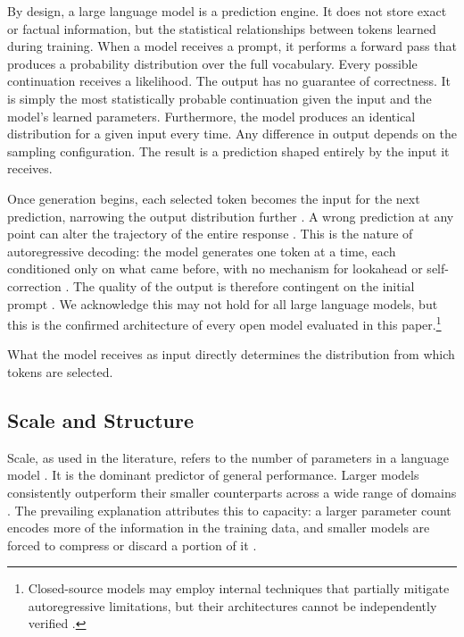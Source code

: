 \documentclass{article}
\begin{document}
By design, a large language model is a prediction engine. It does not store exact or factual information, but the statistical relationships between tokens learned during training. When a model receives a prompt, it performs a forward pass that produces a probability distribution over the full vocabulary. Every possible continuation receives a likelihood. The output has no guarantee of correctness. It is simply the most statistically probable continuation given the input and the model's learned parameters. Furthermore, the model produces an identical distribution for a given input every time. Any difference in output depends on the sampling configuration. The result is a prediction shaped entirely by the input it receives.

Once generation begins, each selected token becomes the input for the next prediction, narrowing the output distribution further \cite{brown2020gpt3}. A wrong prediction at any point can alter the trajectory of the entire response \cite{exposure_bias_ilp2022, lpsr2026}. This is the nature of autoregressive decoding: the model generates one token at a time, each conditioned only on what came before, with no mechanism for lookahead or self-correction \cite{brown2020gpt3, exposure_bias_ilp2022}. The quality of the output is therefore contingent on the initial prompt \cite{prompt_control_theory2023}. We acknowledge this may not hold for all large language models, but this is the confirmed architecture of every open model evaluated in this paper.\footnote{Closed-source models may employ internal techniques that partially mitigate autoregressive limitations, but their architectures cannot be independently verified \cite{liesenfeld2024closed}.}

What the model receives as input directly determines the distribution from which tokens are selected.

\subsection{Scale and Structure}

Scale, as used in the literature, refers to the number of parameters in a language model \cite{kaplan2020scaling}. It is the dominant predictor of general performance. Larger models consistently outperform their smaller counterparts across a wide range of domains \cite{kaplan2020scaling, hoffmann2022chinchilla}. The prevailing explanation attributes this to capacity: a larger parameter count encodes more of the information in the training data, and smaller models are forced to compress or discard a portion of it \cite{llmoverview2023, knowledgecapacity2024}.
\end{document}
